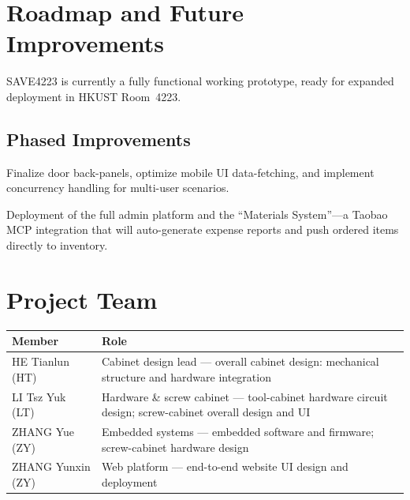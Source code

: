 \documentclass[12pt, a4paper]{article}
\begin{document}
\section{Roadmap and Future Improvements}
\label{sec:roadmap}

SAVE4223 is currently a fully functional working prototype, ready for expanded deployment in HKUST Room~4223.

\subsection*{Phased Improvements}

\begin{description}[nosep, style=nextline]
  \item[Short term (3--4 weeks):] Finalize door back-panels, optimize mobile UI data-fetching, and implement concurrency handling for multi-user scenarios.
  \item[Long term (5+ weeks):] Deployment of the full admin platform and the ``Materials System''---a Taobao MCP integration that will auto-generate expense reports and push ordered items directly to inventory.
\end{description}

\section{Project Team}
\label{sec:team}

\begin{table}[H]
\centering
\begin{tabularx}{\textwidth}{lX}
\toprule
\textbf{Member} & \textbf{Role} \\
\midrule
HE Tianlun (HT)    & Cabinet design lead --- overall cabinet design: mechanical structure and hardware integration \\
LI Tsz Yuk (LT)    & Hardware \& screw cabinet --- tool-cabinet hardware circuit design; screw-cabinet overall design and UI \\
ZHANG Yue (ZY)     & Embedded systems --- embedded software and firmware; screw-cabinet hardware design \\
ZHANG Yunxin (ZY)  & Web platform --- end-to-end website UI design and deployment \\
\bottomrule
\end{tabularx}
\end{table}

\end{document}
